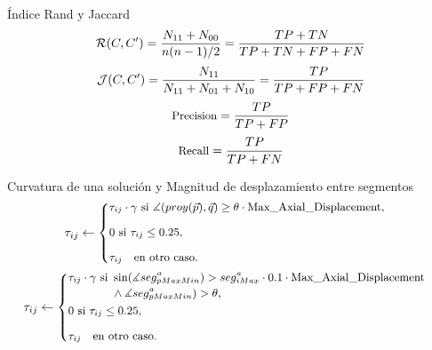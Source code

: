 \begin{frame}{\'Indice Rand y Jaccard}
    \begin{equation}\fontsize{9pt}{7.2}\selectfont
        \mathcal{R}(C,C^{\prime}) = \frac{N_{11} + N_{00}}{n(n-1)/2} = \frac{TP + TN}{TP + TN + FP + FN}
    \end{equation}
    \vspace{0.2cm}
    \begin{equation}\fontsize{9pt}{7.2}\selectfont
        \mathcal{J}(C,C^{\prime}) = \frac{N_{11}}{N_{11} + N_{01} + N_{10}} = \frac{TP}{TP + FP + FN}
    \end{equation}
    \vspace{0.2cm}
    \begin{equation}\fontsize{9pt}{7.2}\selectfont
        \text{Precision} = \frac{TP}{TP + FP}
    \end{equation}
    \vspace{0.2cm}
    \begin{equation}\fontsize{9pt}{7.2}\selectfont
        \text{Recall} = \frac{TP}{TP + FN}
    \end{equation}
\end{frame}


\begin{frame}{Curvatura de una soluci\'on y Magnitud de desplazamiento entre segmentos}
    \begin{equation}\fontsize{9pt}{7.2}\selectfont
    \tau_{ij} \leftarrow
        \begin{cases}
        \tau_{ij} \cdot \gamma \text{ si } \measuredangle(proy(\Vec{p}), \Vec{q}) \geq \theta \cdot \text{Max\_Axial\_Displacement},\\[3ex]
        
        \text{0 si } \tau_{ij} \leq 0.25, \\[3ex]
        \tau_{ij} \quad \text{en otro caso.}
        \end{cases}
    \end{equation}
    \vspace{1cm}
    \begin{equation}\fontsize{9pt}{7.2}\selectfont
    \tau_{ij} \leftarrow
        \begin{cases}
        \begin{split}
         \tau_{ij} \cdot \gamma \text{ si } & \sin(\measuredangle seg^{a}_{pMaxMin}) > seg^{a}_{iMax} \cdot 0.1 \cdot \text{Max\_Axial\_Displacement} \\ & \land \measuredangle seg^{a}_{pMaxMin}) > \theta,
        \end{split}
        \\[3ex]
        
        \text{0 si } \tau_{ij} \leq 0.25, \\[3ex]
        \tau_{ij} \quad \text{en otro caso}.
        \end{cases}
\end{equation}
\end{frame}

